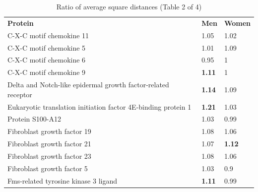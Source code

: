 \begin{table}[ht]
\caption{Ratio of average square distances (Table 2 of 4)}
\centering
\renewcommand{\arraystretch}{1.2}
\begin{tabular}{lll}
\rowcolor[HTML]{FFFFC7} 
\textbf{Protein}                                              & \textbf{Men}                         & \textbf{Women}                       \\
C-X-C motif chemokine 11                                      & {\color[HTML]{C0C0C0} 1.05}          & {\color[HTML]{C0C0C0} 1.02}          \\
C-X-C motif chemokine 5                                       & {\color[HTML]{C0C0C0} 1.01}          & {\color[HTML]{C0C0C0} 1.09}          \\
C-X-C motif chemokine 6                                       & {\color[HTML]{C0C0C0} 0.95}          & {\color[HTML]{C0C0C0} 1}             \\
C-X-C motif chemokine 9                                       & {\color[HTML]{009901} \textbf{1.11}} & {\color[HTML]{C0C0C0} 1}             \\
\rowcolor[HTML]{EFEFEF} 
Delta and Notch-like epidermal growth factor-related receptor & {\color[HTML]{009901} \textbf{1.14}} & {\color[HTML]{C0C0C0} 1.09}          \\
\rowcolor[HTML]{EFEFEF} 
Eukaryotic translation initiation factor 4E-binding protein 1 & {\color[HTML]{009901} \textbf{1.21}} & {\color[HTML]{C0C0C0} 1.03}          \\
\rowcolor[HTML]{EFEFEF} 
Protein S100-A12                                              & {\color[HTML]{C0C0C0} 1.03}          & {\color[HTML]{C0C0C0} 0.99}          \\
\rowcolor[HTML]{EFEFEF} 
Fibroblast growth factor 19                                   & {\color[HTML]{C0C0C0} 1.08}          & {\color[HTML]{C0C0C0} 1.06}          \\
Fibroblast growth factor 21                                   & {\color[HTML]{C0C0C0} 1.07}          & {\color[HTML]{009901} \textbf{1.12}} \\
Fibroblast growth factor 23                                   & {\color[HTML]{C0C0C0} 1.08}          & {\color[HTML]{C0C0C0} 1.06}          \\
Fibroblast growth factor 5                                    & {\color[HTML]{C0C0C0} 1.03}          & {\color[HTML]{C0C0C0} 0.9}           \\
Fms-related tyrosine kinase 3 ligand                          & {\color[HTML]{009901} \textbf{1.11}} & {\color[HTML]{C0C0C0} 0.99}          \\

\end{tabular}
\end{table}
